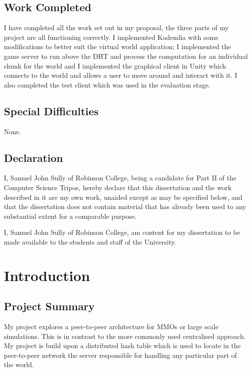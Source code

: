 \documentclass[10pt,twoside,notitlepage,a4paper]{report}
\begin{document}
	\section*{Work Completed}
	I have completed all the work set out in my proposal, the three parts of my project are all functioning correctly. I implemented Kademlia with some modifications to better suit the virtual world application; I implemented the game server to run above the DHT and process the computation for an individual chunk for the world and I implemented the graphical client in Unity which connects to the world and allows a user to move around and interact with it. I also completed the test client which was used in the evaluation stage.
	
	\section*{Special Difficulties}
	None.
	
	\newpage
	\section*{Declaration}
	
	I, Samuel John Sully of Robinson College, being a candidate for Part II of the Computer
	Science Tripos, hereby declare that this dissertation and the work described in it are
	my own work, unaided except as may be specified below, and that the dissertation does
	not contain material that has already been used to any substantial extent for a comparable
	purpose.
	
	\bigskip
	
	\noindent I, Samuel John Sully of Robinson College, am content for my dissertation to be made available to the students and staff of the University.
	
	\cleardoublepage
	
	\tableofcontents
	
	\listoffigures
	
	\newpage

	\cleardoublepage
	
	\setcounter{page}{1}
	\pagestyle{headings}
	
	\chapter{Introduction}
	
	\section{Project Summary}
	My project explores a peer-to-peer architecture for MMOs or large scale simulations. This is in contrast to the more commonly used centralised approach. My project is build upon a distributed hash table which is used to locate in the peer-to-peer network the server responsible for handling any particular part of the world.
	
\end{document}
